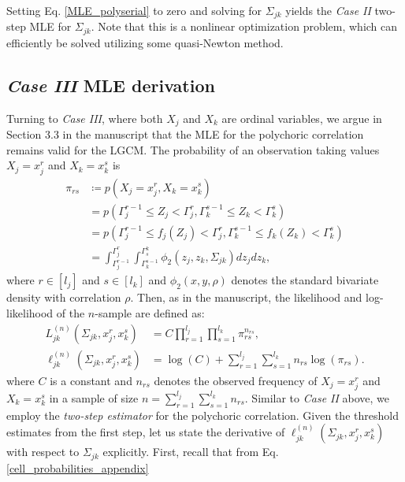 Setting Eq. \eqref{MLE_polyserial} to zero and solving for $\Sigma_{jk}$ yields the \textit{Case II} two-step MLE for $\Sigma_{jk}$. Note that this is a nonlinear optimization problem, which can efficiently be solved utilizing some quasi-Newton method.


\subsection{\textit{Case III} MLE derivation}

Turning to \textit{Case III}, where both $X_j$ and $X_k$ are ordinal variables, we argue in Section 3.3 in the manuscript that the MLE for the polychoric correlation remains valid for the LGCM. The probability of an observation taking values $X_j = x^r_j$ and $X_k = x^s_k$ is
\begin{equation}\label{cell_probabilities_appendix}
    \begin{split}
        \pi_{rs} &\coloneqq p(X_j = x^r_j, X_k = x^s_k) \\
        &= p(\Gamma_j^{r-1} \leq Z_j < \Gamma_j^r, \Gamma_k^{s-1} \leq Z_k < \Gamma_k^s) \\
        &= p(\Gamma_j^{r-1} \leq f_j(Z_j) < \Gamma_j^r, \Gamma_k^{s-1} \leq f_k(Z_k) < \Gamma_k^s) \\
        &= \int_{\Gamma_j^{r-1}}^{\Gamma_j^{r}} \int_{\Gamma_k^{s-1}}^{\Gamma^k_{s}} \phi_2(z_j,z_k,\Sigma_{jk}) dz_j dz_k,
    \end{split}
\end{equation}
where $r \in [l_j]$ and $s \in [l_k]$ and $\phi_2(x,y,\rho)$ denotes the standard bivariate density with correlation $\rho$. Then, as in the manuscript, the likelihood and log-likelihood of the $n$-sample are defined as:
\begin{equation}\label{polychoric_likelihood_appendix}
    \begin{split}
        L_{jk}^{(n)}(\Sigma_{jk}, x_j^r,x_k^s) &= C \prod_{r=1}^{l_{{j}}} \prod_{s=1}^{l_{{k}}} \pi_{rs}^{n_{rs}}, \\
        \ell_{jk}^{(n)}(\Sigma_{jk}, x_j^r,x_k^s) &= \log(C) + \sum_{r=1}^{l_{{j}}}\sum_{s=1}^{l_{{k}}} n_{rs} \log(\pi_{rs}).
    \end{split}
\end{equation}
where $C$ is a constant and $n_{rs}$ denotes the observed frequency of $X_j = x^r_j$ and $X_k = x^s_k$ in a sample of size $n= \sum_{r=1}^{l_{{j}}}\sum_{s=1}^{l_{{k}}} n_{rs}$.
Similar to \textit{Case II} above, we employ the \textit{two-step estimator} for the polychoric correlation. Given the threshold estimates from the first step, let us state the derivative of $\ell_{jk}^{(n)}(\Sigma_{jk}, x_j^r,x_k^s)$ with respect to $\Sigma_{jk}$ explicitly. First, recall that from Eq. \eqref{cell_probabilities_appendix}

